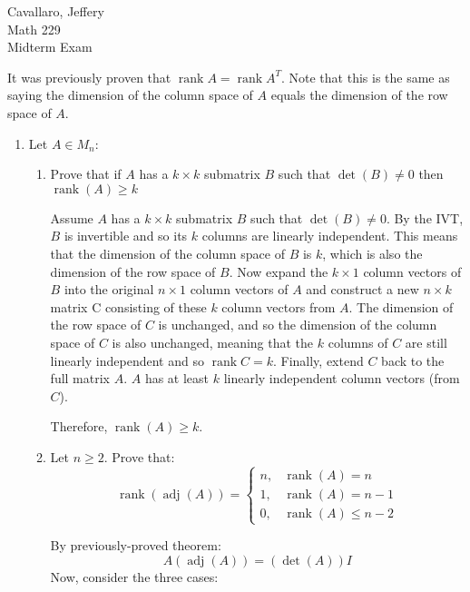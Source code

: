 \documentclass[letterpaper,12pt,fleqn]{article}
\DeclareMathOperator{\rnk}{rank}
\DeclareMathOperator{\adj}{adj}
\begin{document}
Cavallaro, Jeffery \\
Math 229 \\
Midterm Exam

\bigskip

It was previously proven that $\rnk{A}=\rnk{A^T}$. Note that this is the same as saying
the dimension of the column space of $A$ equals the dimension of the row space of $A$.
  
\begin{enumerate}
\item Let $A\in M_n$:


  \begin{enumerate}
  \item Prove that if $A$ has a $k\times k$ submatrix $B$ such that $\det(B)\ne0$
    then $\rnk(A)\ge k$

    Assume $A$ has a $k\times k$ submatrix $B$ such that $\det(B)\ne0$. By the IVT, $B$
    is invertible and so its $k$ columns are linearly independent. This means that the
    dimension of the column space of $B$ is $k$, which is also the dimension of the row
    space of $B$. Now expand the $k\times1$ column vectors of $B$ into the original
    $n\times1$ column vectors of $A$ and construct a new $n\times k$ matrix C consisting
    of these $k$ column vectors from $A$. The dimension of the row space of $C$ is
    unchanged, and so the dimension of the column space of $C$ is also unchanged, meaning
    that the $k$ columns of $C$ are still linearly independent and so $\rnk{C}=k$.
    Finally, extend $C$ back to the full matrix $A$. $A$ has at least $k$ linearly
    independent column vectors (from $C$).

    Therefore, $\rnk(A)\ge k$.

    \bigskip
    
  \item Let $n\ge 2$. Prove that:
    \[\rnk(\adj(A))=\begin{cases}
    n, & \rnk(A)=n \\
    1, & \rnk(A)=n-1 \\
    0, & \rnk(A)\le n-2
    \end{cases}\]

    By previously-proved theorem:
    \[A(\adj(A))=(\det(A))I\]
    Now, consider the three cases:
\end{enumerate}
\end{enumerate}
\end{document}
